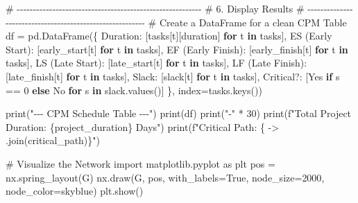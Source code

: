 \documentclass[
  letterpaper,
  DIV=11,
  numbers=noendperiod]{scrreprt}
\newenvironment{Shaded}{\begin{snugshade}}{\end{snugshade}}
\newcommand{\BuiltInTok}[1]{\textcolor[rgb]{0.00,0.23,0.31}{#1}}
\newcommand{\CommentTok}[1]{\textcolor[rgb]{0.37,0.37,0.37}{#1}}
\newcommand{\ControlFlowTok}[1]{\textcolor[rgb]{0.00,0.23,0.31}{\textbf{#1}}}
\newcommand{\DecValTok}[1]{\textcolor[rgb]{0.68,0.00,0.00}{#1}}
\newcommand{\ImportTok}[1]{\textcolor[rgb]{0.00,0.46,0.62}{#1}}
\newcommand{\KeywordTok}[1]{\textcolor[rgb]{0.00,0.23,0.31}{\textbf{#1}}}
\newcommand{\NormalTok}[1]{\textcolor[rgb]{0.00,0.23,0.31}{#1}}
\newcommand{\OperatorTok}[1]{\textcolor[rgb]{0.37,0.37,0.37}{#1}}
\newcommand{\SpecialCharTok}[1]{\textcolor[rgb]{0.37,0.37,0.37}{#1}}
\newcommand{\SpecialStringTok}[1]{\textcolor[rgb]{0.13,0.47,0.30}{#1}}
\newcommand{\StringTok}[1]{\textcolor[rgb]{0.13,0.47,0.30}{#1}}
\newcommand{\VariableTok}[1]{\textcolor[rgb]{0.07,0.07,0.07}{#1}}
\begin{document}
\begin{Shaded}
\begin{Highlighting}[]
\CommentTok{\# {-}{-}{-}{-}{-}{-}{-}{-}{-}{-}{-}{-}{-}{-}{-}{-}{-}{-}{-}{-}{-}{-}{-}{-}{-}{-}{-}{-}{-}{-}{-}{-}{-}{-}{-}{-}{-}{-}{-}{-}{-}{-}{-}{-}{-}{-}{-}{-}{-}{-}{-}{-}{-}{-}{-}{-}{-}}
\CommentTok{\# 6. Display Results}
\CommentTok{\# {-}{-}{-}{-}{-}{-}{-}{-}{-}{-}{-}{-}{-}{-}{-}{-}{-}{-}{-}{-}{-}{-}{-}{-}{-}{-}{-}{-}{-}{-}{-}{-}{-}{-}{-}{-}{-}{-}{-}{-}{-}{-}{-}{-}{-}{-}{-}{-}{-}{-}{-}{-}{-}{-}{-}{-}{-}}
\CommentTok{\# Create a DataFrame for a clean CPM Table}
\NormalTok{df }\OperatorTok{=}\NormalTok{ pd.DataFrame(\{}
    \StringTok{\textquotesingle{}Duration\textquotesingle{}}\NormalTok{: [tasks[t][}\StringTok{\textquotesingle{}duration\textquotesingle{}}\NormalTok{] }\ControlFlowTok{for}\NormalTok{ t }\KeywordTok{in}\NormalTok{ tasks],}
    \StringTok{\textquotesingle{}ES (Early Start)\textquotesingle{}}\NormalTok{: [early\_start[t] }\ControlFlowTok{for}\NormalTok{ t }\KeywordTok{in}\NormalTok{ tasks],}
    \StringTok{\textquotesingle{}EF (Early Finish)\textquotesingle{}}\NormalTok{: [early\_finish[t] }\ControlFlowTok{for}\NormalTok{ t }\KeywordTok{in}\NormalTok{ tasks],}
    \StringTok{\textquotesingle{}LS (Late Start)\textquotesingle{}}\NormalTok{: [late\_start[t] }\ControlFlowTok{for}\NormalTok{ t }\KeywordTok{in}\NormalTok{ tasks],}
    \StringTok{\textquotesingle{}LF (Late Finish)\textquotesingle{}}\NormalTok{: [late\_finish[t] }\ControlFlowTok{for}\NormalTok{ t }\KeywordTok{in}\NormalTok{ tasks],}
    \StringTok{\textquotesingle{}Slack\textquotesingle{}}\NormalTok{: [slack[t] }\ControlFlowTok{for}\NormalTok{ t }\KeywordTok{in}\NormalTok{ tasks],}
    \StringTok{\textquotesingle{}Critical?\textquotesingle{}}\NormalTok{: [}\StringTok{\textquotesingle{}Yes\textquotesingle{}} \ControlFlowTok{if}\NormalTok{ s }\OperatorTok{==} \DecValTok{0} \ControlFlowTok{else} \StringTok{\textquotesingle{}No\textquotesingle{}} \ControlFlowTok{for}\NormalTok{ s }\KeywordTok{in}\NormalTok{ slack.values()]}
\NormalTok{\}, index}\OperatorTok{=}\NormalTok{tasks.keys())}

\BuiltInTok{print}\NormalTok{(}\StringTok{"{-}{-}{-} CPM Schedule Table {-}{-}{-}"}\NormalTok{)}
\BuiltInTok{print}\NormalTok{(df)}
\BuiltInTok{print}\NormalTok{(}\StringTok{"{-}"} \OperatorTok{*} \DecValTok{30}\NormalTok{)}
\BuiltInTok{print}\NormalTok{(}\SpecialStringTok{f"Total Project Duration: }\SpecialCharTok{\{}\NormalTok{project\_duration}\SpecialCharTok{\}}\SpecialStringTok{ Days"}\NormalTok{)}
\BuiltInTok{print}\NormalTok{(}\SpecialStringTok{f"Critical Path: }\SpecialCharTok{\{}\StringTok{\textquotesingle{} {-}\textgreater{} \textquotesingle{}}\SpecialCharTok{.}\NormalTok{join(critical\_path)}\SpecialCharTok{\}}\SpecialStringTok{"}\NormalTok{)}

\CommentTok{\# Visualize the Network}
\ImportTok{import}\NormalTok{ matplotlib.pyplot }\ImportTok{as}\NormalTok{ plt}
\NormalTok{pos }\OperatorTok{=}\NormalTok{ nx.spring\_layout(G)}
\NormalTok{nx.draw(G, pos, with\_labels}\OperatorTok{=}\VariableTok{True}\NormalTok{, node\_size}\OperatorTok{=}\DecValTok{2000}\NormalTok{, node\_color}\OperatorTok{=}\StringTok{\textquotesingle{}skyblue\textquotesingle{}}\NormalTok{)}
\NormalTok{plt.show()}
\end{Highlighting}
\end{Shaded}
\end{document}

